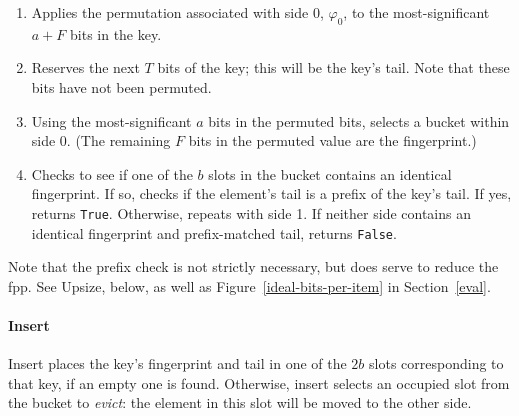 \documentclass[letterpaper,twocolumn,10pt]{article}
\newcommand{\TCF}{SCF}
\newcommand{\TCF}{TCF}
\begin{document}
\begin{enumerate}
\item Applies the permutation associated with side 0, $\varphi_0$, to the most-significant $a + F$ bits in the key. %
\item Reserves the next $T$ bits of the key; this will be the key's tail.
Note that these bits have not been permuted.
\item Using the most-significant $a$ bits in the permuted bits, selects a bucket within side 0. %
(The remaining $F$ bits in the permuted value are the fingerprint.)
\item Checks to see if one of the $b$ slots in the bucket contains an identical fingerprint. %
If so, checks if the element's tail is a prefix of the key's tail.
If yes, returns \verb|True|.
Otherwise, repeats with side 1.
If neither side contains an identical fingerprint and prefix-matched tail, returns \verb|False|.
\end{enumerate}

Note that the prefix check is not strictly necessary, but does serve to reduce the fpp.
See Upsize, below, as well as Figure~\ref{ideal-bits-per-item} in Section~\ref{eval}.



\paragraph{Insert}
Insert places the key's fingerprint and tail in one of the $2b$ slots corresponding to that key, if an empty one is found.
Otherwise, insert selects an occupied slot from the bucket to {\em evict}: the element in this slot will be moved to the other side. %
\end{document}
